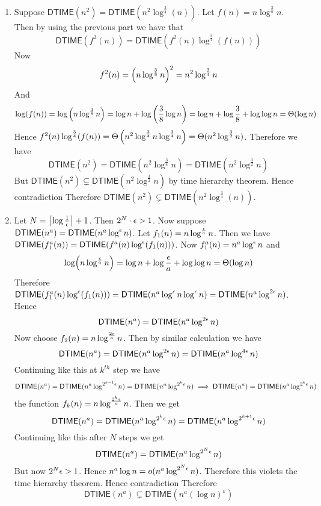 \documentclass[a4paper, 11pt]{article}
\begin{document}
{\begin{enumerate}[label=(\alph*)]
Certainly $M''$ runs in $O(t_2(f(n)))$ time. Therefore $L''\in \textsf{DTIME}(t_2(f(n)))$. Hence $$	\textsf{DTIME}\left(t_1(f(n))\right)\subseteq \textsf{DTIME}\left(t_2(f(n))\right)$$ With similarly argument by switching $t_1$ and $t_2$ we can show $	\textsf{DTIME}\left(t_1(f(n))\right)\supseteq \textsf{DTIME}\left(t_2(f(n))\right)$. Therefore we have $	\textsf{DTIME}\left(t_1(f(n))\right)= \textsf{DTIME}\left(t_2(f(n))\right)$
\item Suppose $\textsf{DTIME}\left(n^2\right) = \textsf{DTIME}\left(n^2 \log ^{\frac34}(n)\right)$. Let $f(n)=n\log ^{\frac38}n$. Then by using the previous part we have that $$\textsf{DTIME}\left(f^2(n)\right) = \textsf{DTIME}\left(f^2(n) \log ^{\frac34}(f(n))\right)$$Now $$f^2(n)=\left(n\log^{\frac38}n\right)^2=n^2\log^{\frac34}n$$And $$\log (f(n))=\log \left(n\log^{\frac38}n\right)=\log n+\log \left(\frac38\log n\right)=\log n+\log\frac38+\log\log n=\Theta(\log n)$$Hence $f^2(n)\log^{\frac34}(f(n))=\Theta\left(n^2\log^{\frac34}n\log^{\frac34}n\right)=\Theta(n^2\log^{\frac32}n)$. Therefore we have $$\textsf{DTIME}(n^2)=\textsf{DTIME}(n^2\log^{\frac34}n)=\textsf{DTIME}(n^2\log^{\frac32}n)$$But $\textsf{DTIME}(n^2)\subsetneq \textsf{DTIME}(n^2\log^{\frac32}n)$ by time hierarchy theorem. Hence contradiction \ctr Therefore $\textsf{DTIME}\left(n^2\right) \subsetneq \textsf{DTIME}\left(n^2 \log ^{\frac34}(n)\right)$.
\item Let $N=\left\lceil \log \frac1{\epsilon}\right\rceil+1$. Then $2^N\cdot\epsilon>1$. Now suppose $\textsf{DTIME}(n^a)=\textsf{DTIME}(n^a\log^{\epsilon}n)$. Let $f_1(n)=n\log^{\frac{\epsilon}a}n$. Then we have $\textsf{DTIME}(f_1^a(n))=\textsf{DTIME}(f^a(n)\log^{\epsilon}(f_1(n)))$. Now $f_1^a(n)=n^a\log^{\epsilon}n$ and $$\log (n\log^{\frac{\epsilon}a}n)=\log n+\log\frac{\epsilon}a+\log\log n=\Theta(\log n)$$Therefore $\textsf{DTIME}(f_1^a(n)\log^{\epsilon}(f_1(n)))=\textsf{DTIME}(n^a\log^{\epsilon}n\log ^{\epsilon}n)=\textsf{DTIME}(n^a\log^{2\epsilon}n)$. Hence $$\textsf{DTIME}(n^a)=\textsf{DTIME}(n^a\log^{2\epsilon}n)$$Now choose $f_2(n)=n\log^{\frac{2\epsilon}a}n$. Then by similar calculation we have $$\textsf{DTIME}(n^a)=\textsf{DTIME}(n^a\log^{2\epsilon}n)=\textsf{DTIME}(n^a\log^{4\epsilon}n)$$Continuing like this at $k^{th}$ step we have $$\textsf{DTIME}(n^a)=\textsf{DTIME}(n^a\log^{2^{k-1}\epsilon}n)=\textsf{DTIME}(n^a\log^{2^k\epsilon}n)\implies \textsf{DTIME}(n^a)=\textsf{DTIME}(n^a\log^{2^k\epsilon}n)$$ the function $f_k(n)=n\log^{\frac{2^k\epsilon}a}n$. Then we get $$\textsf{DTIME}(n^a)=\textsf{DTIME}(n^a\log^{2^k\epsilon}n)=\textsf{DTIME}(n^a\log^{2^{k+1}\epsilon}n)$$Continuing like this after $N$ steps we get $$\textsf{DTIME}(n^a)=\textsf{DTIME}(n^a\log^{2^{N}\epsilon}n)$$But now $2^N\epsilon>1$. Hence $n^a\log n=o(n^a\log^{2^{N}\epsilon}n)$. Therefore this violets the time hierarchy theorem. Hence contradiction \ctr Therefore $$
\textsf{DTIME}\left(n^a\right) \subsetneq \textsf{DTIME}\left(n^a(\log n)^{\varepsilon}\right)
$$
\end{enumerate}
}
\end{document}
